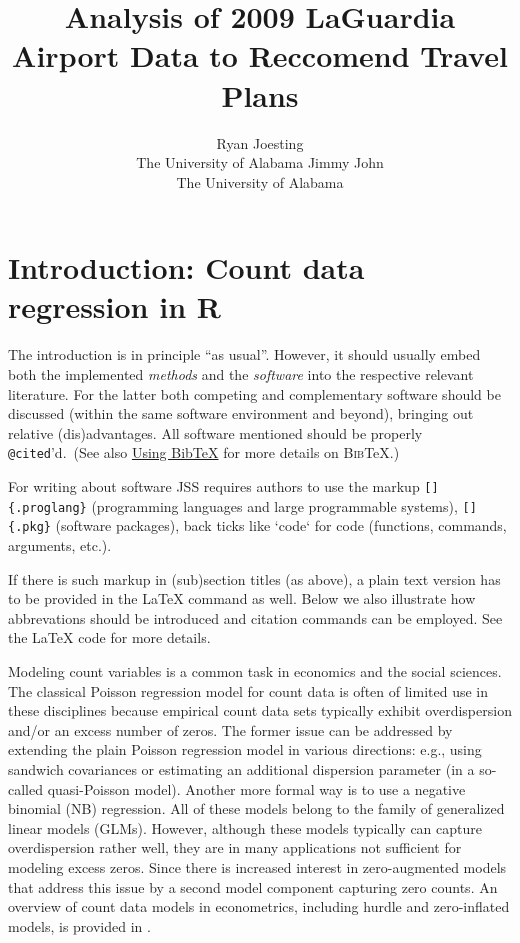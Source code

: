 \documentclass[
  nojss,
  article]{jss}
\author{Ryan Joesting\\The University of Alabama \And Jimmy John\\The
University of Alabama}
\title{Analysis of 2009 LaGuardia Airport Data to Reccomend Travel
Plans}
\begin{document}
\maketitle


\section{Introduction: Count data regression in R}\label{sec-intro}

\begin{tcolorbox}[enhanced jigsaw, colframe=quarto-callout-color-frame, colback=white, rightrule=.15mm, toprule=.15mm, breakable, arc=.35mm, bottomrule=.15mm, leftrule=.75mm, left=2mm, opacityback=0]

The introduction is in principle ``as usual''. However, it should
usually embed both the implemented \emph{methods} and the
\emph{software} into the respective relevant literature. For the latter
both competing and complementary software should be discussed (within
the same software environment and beyond), bringing out relative
(dis)advantages. All software mentioned should be properly
\texttt{@cited}'d.~(See also \hyperref[sec-bibtex]{Using BibTeX} for
more details on \textsc{Bib}{\TeX}.)

For writing about software JSS requires authors to use the markup
\texttt{{[}{]}\{.proglang\}} (programming languages and large
programmable systems), \texttt{{[}{]}\{.pkg\}} (software packages), back
ticks like `code` for code (functions, commands, arguments, etc.).

If there is such markup in (sub)section titles (as above), a plain text
version has to be provided in the {\LaTeX} command as well. Below we
also illustrate how abbrevations should be introduced and citation
commands can be employed. See the {\LaTeX} code for more details.

\end{tcolorbox}

Modeling count variables is a common task in economics and the social
sciences. The classical Poisson regression model for count data is often
of limited use in these disciplines because empirical count data sets
typically exhibit overdispersion and/or an excess number of zeros. The
former issue can be addressed by extending the plain Poisson regression
model in various directions: e.g., using sandwich covariances or
estimating an additional dispersion parameter (in a so-called
quasi-Poisson model). Another more formal way is to use a negative
binomial (NB) regression. All of these models belong to the family of
generalized linear models (GLMs). However, although these models
typically can capture overdispersion rather well, they are in many
applications not sufficient for modeling excess zeros. Since
\citet{Mullahy1986} there is increased interest in zero-augmented models
that address this issue by a second model component capturing zero
counts. An overview of count data models in econometrics, including
hurdle and zero-inflated models, is provided in
\citet{CameronTrivedi2013}.
\end{document}
